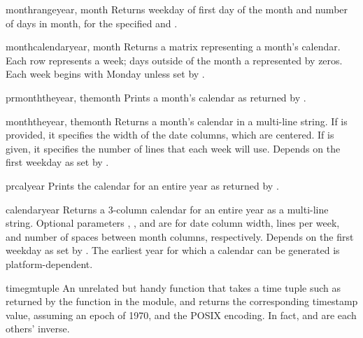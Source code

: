 \begin{funcdesc}{monthrange}{year, month}
Returns weekday of first day of the month and number of days in month, 
for the specified  and .
\end{funcdesc}

\begin{funcdesc}{monthcalendar}{year, month}
Returns a matrix representing a month's calendar.  Each row represents
a week; days outside of the month a represented by zeros.
Each week begins with Monday unless set by .
\end{funcdesc}

\begin{funcdesc}{prmonth}{theyear, themonth}
Prints a month's calendar as returned by .
\end{funcdesc}

\begin{funcdesc}{month}{theyear, themonth}
Returns a month's calendar in a multi-line string. If  is
provided, it specifies the width of the date columns, which are
centered. If  is given, it specifies the number of lines that
each week will use. Depends on the first weekday as set by
.
\end{funcdesc}

\begin{funcdesc}{prcal}{year}
Prints the calendar for an entire year as returned by 
.
\end{funcdesc}

\begin{funcdesc}{calendar}{year}
Returns a 3-column calendar for an entire year as a multi-line string.
Optional parameters , , and  are for date column
width, lines per week, and number of spaces between month columns,
respectively. Depends on the first weekday as set by
.  The earliest year for which a calendar can
be generated is platform-dependent.
\end{funcdesc}

\begin{funcdesc}{timegm}{tuple}
An unrelated but handy function that takes a time tuple such as
returned by the  function in the 
module, and returns the corresponding \UNIX{} timestamp value, assuming
an epoch of 1970, and the POSIX encoding.  In fact,
 and  are each others' inverse.
\end{funcdesc}


\begin{seealso}
\end{seealso}
